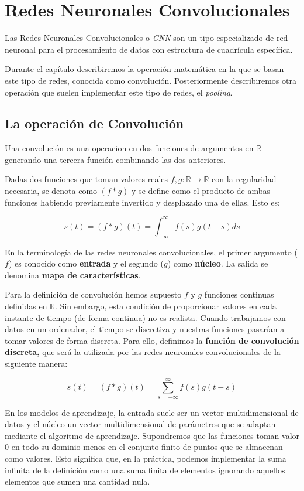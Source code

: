 \chapter{Redes Neuronales Convolucionales}

	Las Redes Neuronales Convolucionales o \textit{CNN} son un tipo especializado de red neuronal para el procesamiento de datos con estructura de cuadrícula específica. 
	
	Durante el capítulo describiremos la operación matemática en la que se basan este tipo de redes, conocida como convolución. Posteriormente describiremos otra operación que suelen implementar este tipo de redes, el \textit{pooling}. 
	
	\section{La operación de Convolución}
	
	Una convolución es una operacion en dos funciones de argumentos en $\mathbb{R}$ generando una tercera función combinando las dos anteriores. 
	
	Dadas dos funciones que toman valores reales $f, g: \mathbb{R} \rightarrow \mathbb{R}$ con la regularidad necesaria, se denota como $(f \ast g)$ y se define como el producto de ambas funciones habiendo previamente invertido y desplazado una de ellas. Esto es:
	
	$$
		s(t) =	(f \ast g)(t) = \int_{- \infty}^{\infty} f(s) g(t-s) ds
	$$	
	
	En la terminología de las redes neuronales convolucionales, el primer argumento ($f$) es conocido como \textbf{entrada}  y el segundo ($g$) como \textbf{núcleo}. La salida se denomina \textbf{mapa de características}. 
	
	 Para la definición de convolución hemos supuesto $f$ y $g$ funciones continuas definidas en $\mathbb{R}$. Sin embargo, esta condición de proporcionar valores en cada instante de tiempo (de forma continua) no es realista. Cuando trabajamos con datos en un ordenador, el tiempo se discretiza y nuestras funciones pasarían a tomar valores de forma discreta. Para ello, definimos la \textbf{función de convolución discreta,} que será la utilizada por las redes neuronales convolucionales de la siguiente manera:
	 
	 $$
		 s(t) =	(f \ast g)(t) = \sum_{s = - \infty}^{\infty} f(s) g(t-s) 
	 $$
	 
	En los modelos de aprendizaje, la entrada suele ser un vector multidimensional de datos y el núcleo un vector multidimensional de parámetros que se adaptan mediante el algoritmo de aprendizaje. Supondremos que las funciones toman valor 0 en todo su dominio menos en el conjunto finito de puntos que se almacenan como valores. Esto significa que, en la práctica, podemos implementar la suma infinita de la definición como una suma finita de elementos ignorando aquellos elementos que sumen una cantidad nula.
	
